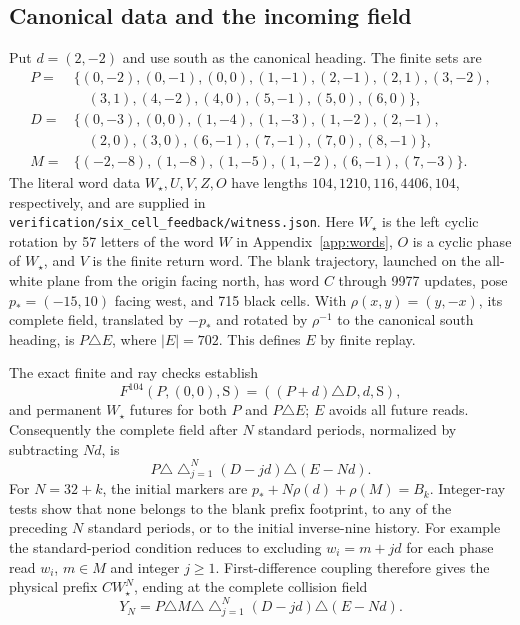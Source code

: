 \subsection{Canonical data and the incoming field}
Put $d=(2,-2)$ and use south as the canonical heading. The finite sets are
\begin{align*}
P={}&\{(0,-2),(0,-1),(0,0),(1,-1),(2,-1),(2,1),(3,-2),\\
 &\hspace{1em}(3,1),(4,-2),(4,0),(5,-1),(5,0),(6,0)\},\\
D={}&\{(0,-3),(0,0),(1,-4),(1,-3),(1,-2),(2,-1),\\
 &\hspace{1em}(2,0),(3,0),(6,-1),(7,-1),(7,0),(8,-1)\},\\
M={}&\{(-2,-8),(1,-8),(1,-5),(1,-2),(6,-1),(7,-3)\}.
\end{align*}
The literal word data $W_\star,U,V,Z,O$ have lengths $104,1210,116,4406,104$,
respectively, and are supplied in \texttt{verification/six\_cell\_feedback/witness.json}.
Here $W_\star$ is the left cyclic rotation by 57 letters of the word $W$
in Appendix~\ref{app:words}, $O$ is a cyclic phase of $W_\star$, and $V$ is the
finite return word. The blank trajectory, launched on the all-white plane from the origin facing
north, has word $C$ through 9977 updates, pose
$p_*=(-15,10)$ facing west, and 715 black cells. With
$\rho(x,y)=(y,-x)$, its complete field, translated by $-p_*$ and rotated by $\rho^{-1}$
to the canonical south heading, is $P\triangle E$, where $|E|=702$.
This defines $E$ by finite replay.

The exact finite and ray checks establish
\[
 F^{104}(P,(0,0),\mathrm S)=((P+d)\triangle D,d,\mathrm S),
\]
and permanent $W_\star$ futures for both $P$ and $P\triangle E$; $E$ avoids all
future reads. Consequently the complete field after $N$ standard periods,
normalized by subtracting $Nd$, is
\[
 P\triangle\mathop{\triangle}_{j=1}^{N}(D-jd)\triangle(E-Nd).
\]
For $N=32+k$, the initial markers are $p_*+N\rho(d)+\rho(M)=B_k$.
Integer-ray tests show that none belongs to the blank prefix footprint, to any
of the preceding $N$ standard periods, or to the initial inverse-nine history.
For example the standard-period condition reduces to excluding
$w_i=m+jd$ for each phase read $w_i$, $m\in M$ and integer $j\ge1$.
First-difference coupling therefore gives the physical prefix $CW_\star^N$, ending
at the complete collision field
\begin{equation}\label{eq:six-Y}
 Y_N=P\triangle M\triangle\mathop{\triangle}_{j=1}^{N}(D-jd)
          \triangle(E-Nd).
\end{equation}

